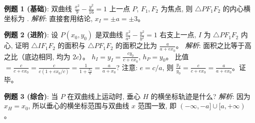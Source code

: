 \begin{examplebox}
\textbf{例题 1 (基础)}: 双曲线 $\frac{x^2}{9} - \frac{y^2}{16} = 1$ 上一点 $P$, $F_1, F_2$ 为焦点, 则 $\triangle PF_1F_2$ 的内心横坐标为 \underline{\qquad}.
\textit{解析}: 直接套用结论, $x_I = \pm a = \pm 3$。

\textbf{例题 2 (进阶)}: 设 $P(x_0, y_0)$ 是双曲线 $\frac{x^2}{a^2} - \frac{y^2}{b^2} = 1$ 右支上一点, $I$ 为 $\triangle PF_1F_2$ 内心, 证明 $\triangle IF_1F_2$ 的面积与 $\triangle PF_1F_2$ 的面积之比为 $\frac{a}{a+ex_0}$。
\textit{解析}: 
面积之比等于高之比（底边相同, 均为 $2c$）。
$h_I = y_I = \frac{cy_0}{c+ex_0}$, $h_P = y_0$。
比值 $= \frac{c}{c+ex_0} = \frac{c}{c(1+ex_0/c)} = \frac{1}{1 + \frac{x_0}{a}} = \frac{a}{a+x_0}$? 
注意: $e = c/a$, 则 $\frac{y_I}{y_0} = \frac{c}{c+ex_0} = \frac{a}{a+ex_0}$。证毕。

\textbf{例题 3 (综合)}: 当 $P$ 在双曲线上运动时, 垂心 $H$ 的横坐标轨迹是什么?
\textit{解析}: 因为 $x_H = x_0$, 所以垂心的横坐标范围与双曲线 $x$ 范围一致, 即 $(-\infty, -a] \cup [a, +\infty)$。
\end{examplebox}